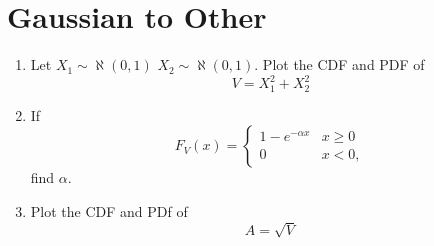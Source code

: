 \documentclass[journal,12pt,twocolumn]{IEEEtran}
\renewcommand\thesection{\arabic{section}}
\begin{document}
\section{Gaussian to Other}
\begin{enumerate}[label=\thesection.\arabic*
,ref=\thesection.\theenumi]
\item
Let $X_1 \sim \aleph(0,1)$  $X_2 \sim \aleph(0,1)$. Plot the CDF and PDF of
%
\begin{equation}
V = X_1^2 + X_2^2
\end{equation}
%
%
%
\item
If
%
\begin{equation}
F_{V}(x) = 
\begin{cases}
1 - e^{-\alpha x} & x \geq 0 \\
0 & x < 0,
\end{cases}
\end{equation}
%
find $\alpha$.
%
\item
\label{ch3_raleigh_sim}
Plot the CDF and PDf of
%
\begin{equation}
A = \sqrt{V}
\end{equation}
%
\end{enumerate}
\end{document}
